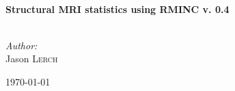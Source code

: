 \begin{titlepage}
 
\begin{center}
 
 
 
 
 
 
\HRule \\[0.4cm]
{ \huge \bfseries Structural MRI statistics using RMINC v. 0.4}\\[0.4cm]
 
\HRule \\[1.5cm]
 
\begin{minipage}{0.4\textwidth}
\begin{center}
\emph{Author:}\\
Jason \textsc{Lerch}
\end{center}
\end{minipage}
 
\vfill
 
{\large \today}
 
\end{center}
 
\end{titlepage}

